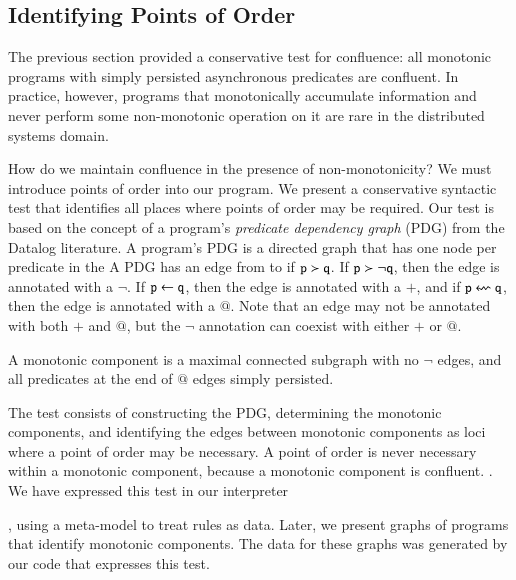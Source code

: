 \subsection{Identifying Points of Order}
The previous section provided a conservative test for confluence: all monotonic
programs with simply persisted asynchronous predicates are confluent.  In
practice, however, programs that monotonically accumulate information and never
perform some non-monotonic operation on it are rare in the distributed systems
domain.


How do we maintain confluence in the presence of non-monotonicity?  We must
introduce points of order into our program.  We present a conservative
syntactic test that identifies all places where points of order may be
required.  Our test is based on the concept of a program's {\em predicate
dependency graph} (PDG) from the Datalog literature.  A \lang program's PDG is
a directed graph that has one node per predicate in the A PDG has an edge from
 to  if $\dedalus{p} \succ \dedalus{q}$.  If $\dedalus{p}
\succ \lnot\dedalus{q}$, then the edge is annotated with a $\lnot$.  If
$\dedalus{p} \gets \dedalus{q}$, then the edge is annotated with a $+$, and if
$\dedalus{p} \leftsquigarrow \dedalus{q}$, then the edge is annotated with a
$@$.  Note that an edge may not be annotated with both $+$ and $@$, but the
$\lnot$ annotation can coexist with either $+$ or $@$.

\begin{definition}
%
A monotonic component is a maximal connected subgraph with no $\lnot$ edges,
and all predicates at the end of $@$ edges simply persisted.
%
\end{definition}

The test consists of constructing the PDG, determining the monotonic
components, and identifying the edges between monotonic components as loci
where a point of order may be necessary.  A point of order is never necessary
within a monotonic component, because a monotonic component is confluent.
.  We have expressed this test in our \lang 
interpreter

, using a meta-model to treat rules as data.  Later, we present graphs of programs that
identify monotonic components.  The data for these graphs was generated by our
\lang code that expresses this test.
